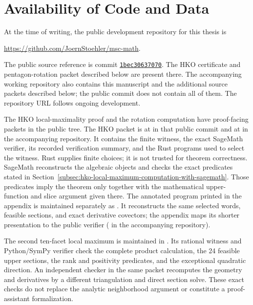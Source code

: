 \section{Availability of Code and Data}\label{sec:published-code-data}

At the time of writing, the public development repository for this thesis is
\begin{center}
  \url{https://github.com/JoernStoehler/msc-math}.
\end{center}
The public source reference is commit
\href{https://github.com/JoernStoehler/msc-math/tree/1bec30637070effe7ab8b0a022ae62e83f6bbcab}{\texttt{1bec30637070}}. The HKO certificate and
pentagon-rotation packet described below are present there. The accompanying
working repository also contains this manuscript and the additional source
packets described below; the public commit does not contain all of them.
The repository URL follows ongoing development.

\begin{sloppypar}
The HKO local-maximality proof and the rotation computation have
proof-facing packets in the public tree. The HKO packet is at
 in that public commit and at
 in the
accompanying repository. It contains the finite witness, the
exact SageMath verifier, its recorded verification summary, and the Rust
programs used to select the witness.  Rust supplies finite choices; it is not
trusted for theorem correctness.  SageMath reconstructs the algebraic objects
and checks the exact predicates stated in
Section~\ref{subsec:hko-local-maximum-computation-with-sagemath}.  Those
predicates imply the theorem only together with the mathematical
upper-function and slice argument given there.
The annotated program printed in the appendix is maintained separately as
. It reconstructs the same selected
words, feasible sections, and exact derivative covectors; the appendix maps
its shorter presentation to the public verifier
(
in the accompanying repository).

The second ten-facet local maximum is maintained in
. Its rational witness and
Python/SymPy verifier check the complete product calculation, the 24 feasible
upper sections, the rank and positivity predicates, and the exceptional
quadratic direction. An independent checker in the same packet recomputes the
geometry and derivatives by a different triangulation and direct section
solve. These exact checks do not replace the analytic neighborhood argument
or constitute a proof-assistant formalization.

\end{sloppypar}

